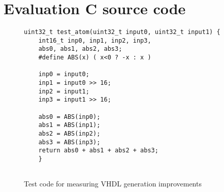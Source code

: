 \section{Evaluation C source code}
\begin{figure}
	\centering
	\begin{lstlisting}[frame=single]
	uint32_t test_atom(uint32_t input0, uint32_t input1) {
	int16_t inp0, inp1, inp2, inp3,
	abs0, abs1, abs2, abs3;
	#define ABS(x) ( x<0 ? -x : x )
	
	inp0 = input0;
	inp1 = input0 >> 16;
	inp2 = input1;
	inp3 = input1 >> 16;
	
	abs0 = ABS(inp0);
	abs1 = ABS(inp1);
	abs2 = ABS(inp2);
	abs3 = ABS(inp3);
	return abs0 + abs1 + abs2 + abs3;
	}
	
	\end{lstlisting}
	\caption{Test code for measuring VHDL generation improvements}
	\label{code:vhdl-eval}
\end{figure}